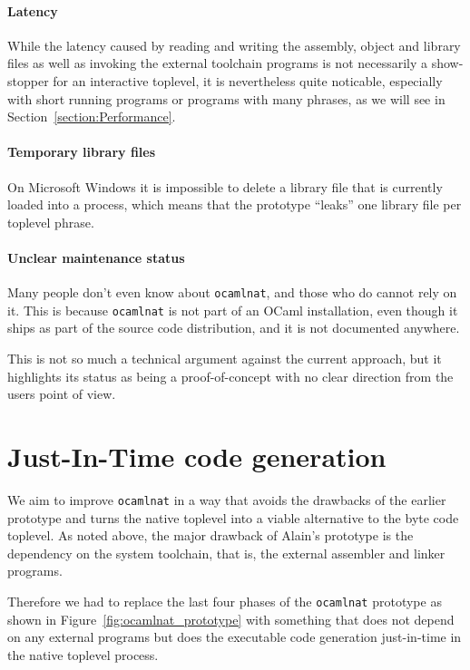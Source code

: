 \documentclass[10pt,a4paper,draft,twocolumn]{article}
\begin{document}
\paragraph{Latency}

While the latency caused by reading and writing the assembly, object and library files as well as invoking the
external toolchain programs is not necessarily a show-stopper for an interactive toplevel, it is nevertheless
quite noticable, especially with short running programs or programs with many phrases, as we will see in
Section~\ref{section:Performance}.

\paragraph{Temporary library files}

On Microsoft Windows it is impossible to delete a library file that is currently loaded into a process, which
means that the prototype ``leaks'' one library file per toplevel phrase.

\paragraph{Unclear maintenance status}

Many people don't even know about \texttt{ocamlnat}, and those who do cannot rely on it. This is because
\texttt{ocamlnat} is not part of an OCaml installation, even though it ships as part of the source code
distribution, and it is not documented anywhere.

This is not so much a technical argument against the current approach, but it highlights its status as
being a proof-of-concept with no clear direction from the users point of view.


\section{Just-In-Time code generation} \label{section:Just_In_Time_code_generation}

We aim to improve \texttt{ocamlnat} in a way that avoids the drawbacks of the earlier prototype
and turns the native toplevel into a viable alternative to the byte code toplevel. As noted above,
the major drawback of Alain's prototype is the dependency on the system toolchain, that is, the
external assembler and linker programs.

Therefore we had to replace the last four phases of the \texttt{ocamlnat} prototype as shown in
Figure~\ref{fig:ocamlnat_prototype} with something that does not depend on any external programs
but does the executable code generation just-in-time in the native toplevel process.
\end{document}

